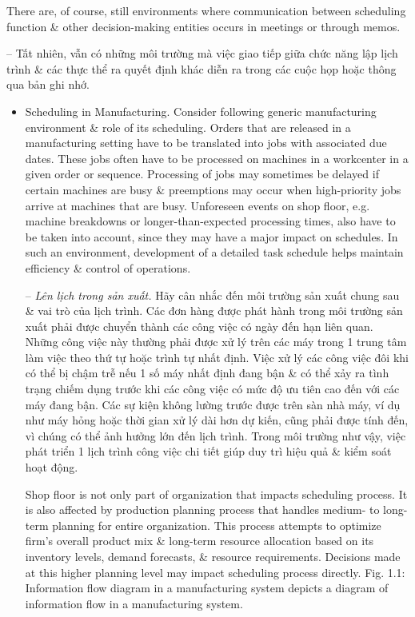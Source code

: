 \documentclass{article}
\begin{document}
\begin{itemize}
\begin{itemize}
        There are, of course, still environments where communication between scheduling function \& other decision-making entities occurs in meetings or through memos.
        
        -- Tất nhiên, vẫn có những môi trường mà việc giao tiếp giữa chức năng lập lịch trình \& các thực thể ra quyết định khác diễn ra trong các cuộc họp hoặc thông qua bản ghi nhớ.
        \begin{itemize}
            \item {\sf Scheduling in Manufacturing.} Consider following generic manufacturing environment \& role of its scheduling. Orders that are released in a manufacturing setting have to be translated into jobs with associated due dates. These jobs often have to be processed on machines in a workcenter in a given order or sequence. Processing of jobs may sometimes be delayed if certain machines are busy \& preemptions may occur when high-priority jobs arrive at machines that are busy. Unforeseen events on shop floor, e.g. machine breakdowns or longer-than-expected processing times, also have to be taken into account, since they may have a major impact on schedules. In such an environment, development of a detailed task schedule helps maintain efficiency \& control of operations.
            
            -- {\it Lên lịch trong sản xuất.} Hãy cân nhắc đến môi trường sản xuất chung sau \& vai trò của lịch trình. Các đơn hàng được phát hành trong môi trường sản xuất phải được chuyển thành các công việc có ngày đến hạn liên quan. Những công việc này thường phải được xử lý trên các máy trong 1 trung tâm làm việc theo thứ tự hoặc trình tự nhất định. Việc xử lý các công việc đôi khi có thể bị chậm trễ nếu 1 số máy nhất định đang bận \& có thể xảy ra tình trạng chiếm dụng trước khi các công việc có mức độ ưu tiên cao đến với các máy đang bận. Các sự kiện không lường trước được trên sàn nhà máy, ví dụ như máy hỏng hoặc thời gian xử lý dài hơn dự kiến, cũng phải được tính đến, vì chúng có thể ảnh hưởng lớn đến lịch trình. Trong môi trường như vậy, việc phát triển 1 lịch trình công việc chi tiết giúp duy trì hiệu quả \& kiểm soát hoạt động.
            
            Shop floor is not only part of organization that impacts scheduling process. It is also affected by production planning process that handles medium- to long-term planning for entire organization. This process attempts to optimize firm's overall product mix \& long-term resource allocation based on its inventory levels, demand forecasts, \& resource requirements. Decisions made at this higher planning level may impact scheduling process directly. {\sf Fig. 1.1: Information flow diagram in a manufacturing system} depicts a diagram of information flow in a manufacturing system.
            

\end{itemize}
\end{itemize}
\end{itemize}
\end{document}
